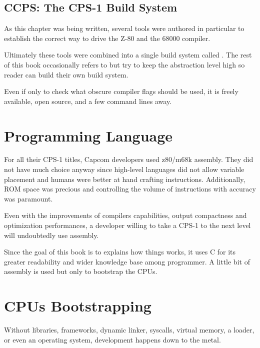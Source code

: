 \subsection{CCPS: The CPS-1 Build System}
As this chapter was being written, several tools were authored in particular to establish the correct way to drive the Z-80 and the 68000 compiler. 

Ultimately these tools were combined into a single build system called . The rest of this book occasionally refers to  but try to keep the abstraction level high so reader can build their own build system. 

Even if only to check what obscure compiler flags should be used, it is freely available, open source, and a few command lines away.






\section{Programming Language}
For all their CPS-1 titles, Capcom developers used z80/m68k assembly. They did not have much choice anyway since high-level languages did not allow variable placement and humans were better at hand crafting instructions. Additionally, ROM space was precious and controlling the volume of instructions with accuracy was paramount.

Even with the improvements of compilers capabilities, output compactness and optimization performances, a developer willing to take a CPS-1 to the next level will undoubtedly use assembly.

Since the goal of this book is to explains how things works, it uses C for its greater readability and wider knowledge base among programmer. A little bit of assembly is used but only to bootstrap the CPUs.
	
\section{CPUs Bootstrapping}
Without libraries, frameworks, dynamic linker, syscalls, virtual memory, a loader, or even an operating system, development happens down to the metal. 

